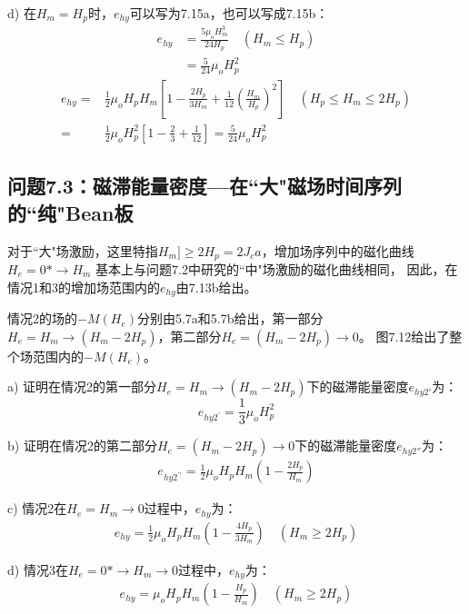 d) 在$H_m=H_p$时，$e_{hy}$可以写为7.15a，也可以写成7.15b：
\begin{align*}%
e_{hy}&=\frac{5\mu_oH_{m}^{3}}{24H_p} \quad (H_m\leq H_p) \\ \tag{71.5a}
&=\frac{5}{24}\mu_oH_{p}^{2}
\end{align*}
\begin{align*}%
e_{hy}=&\frac{1}{2}\mu_oH_pH_m\left[1-\frac{2H_p}{3H_m}+\frac{1}{12}\left(\frac{H_m}{H_p}\right)^2\right] \quad  (H_p\leq H_m\leq 2H_p) \\\tag{7.15b}
=&\frac{1}{2}\mu_oH_{p}^{2}\left[1-\frac{2}{3}+\frac{1}{12}\right]=\frac{5}{24}\mu_oH_{p}^{2}
\end{align*}


\subsection{问题7.3：磁滞能量密度---在``大"磁场时间序列的``纯"Bean板}
对于``大"场激励，这里特指$H_m]\ge 2H_p= 2J_c a$，增加场序列中的磁化曲线$H_e = 0*\rightarrow H_m$
基本上与问题7.2中研究的``中"场激励的磁化曲线相同， 因此，在情况1和3的增加场范围内的$e_{hy}$由7.13b给出。

情况2的场的$-M(H_e)$分别由5.7a和5.7b给出，第一部分$H_e = H_m\rightarrow (H_m-2H_p)$，第二部分$H_e=(H_m-2H_p)\rightarrow 0$。
图7.12给出了整个场范围内的$-M(H_e)$。

a) 证明在情况2的第一部分$H_e = H_m\rightarrow (H_m-2H_p)$下的磁滞能量密度$e_{hy2'}$为：
\begin{equation}%
e_{hy2^\prime}=\frac{1}{3}\mu_oH_{p}^{2}
\end{equation}

b) 证明在情况2的第二部分$H_e=(H_m-2H_p)\rightarrow 0$下的磁滞能量密度$e_{hy2''}$为：
\begin{align*}%
e_{hy2^{\prime\prime}}=\frac{1}{2}\mu_oH_pH_m\left(1-\frac{2H_p}{H_m}\right) \tag{7.16b}
\end{align*}

c) 情况2在$H_e=H_m\rightarrow 0$过程中，$e_{hy}$为：
\begin{align*}%
e_{hy}=\frac{1}{2}\mu_oH_pH_m\left(1-\frac{4H_p}{3H_m}\right)  \quad   (H_m\geq 2H_p) \tag{7.14b}
\end{align*}

d) 情况3在$H_e=0*\rightarrow H_m\rightarrow 0$过程中，$e_{hy}$为：
\begin{align*}%
e_{hy}=\mu_oH_pH_m\left(1-\frac{H_p}{H_m}\right) \quad   (H_m\geq 2H_p)
\end{align*}

